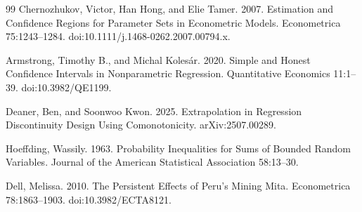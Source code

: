 \documentclass{article}
\begin{document}
\begin{thebibliography}{99}
   Chernozhukov, Victor, Han Hong, and Elie Tamer. 2007. Estimation and Confidence Regions for Parameter Sets in Econometric Models. Econometrica 75:1243--1284. doi:10.1111/j.1468-0262.2007.00794.x.

   Armstrong, Timothy B., and Michal Kolesár. 2020. Simple and Honest Confidence Intervals in Nonparametric Regression. Quantitative Economics 11:1--39. doi:10.3982/QE1199.

   Deaner, Ben, and Soonwoo Kwon. 2025. Extrapolation in Regression Discontinuity Design Using Comonotonicity. arXiv:2507.00289.

   Hoeffding, Wassily. 1963. Probability Inequalities for Sums of Bounded Random Variables. Journal of the American Statistical Association 58:13--30.

   Dell, Melissa. 2010. The Persistent Effects of Peru's Mining Mita. Econometrica 78:1863--1903. doi:10.3982/ECTA8121.

\end{thebibliography}
\end{document}
